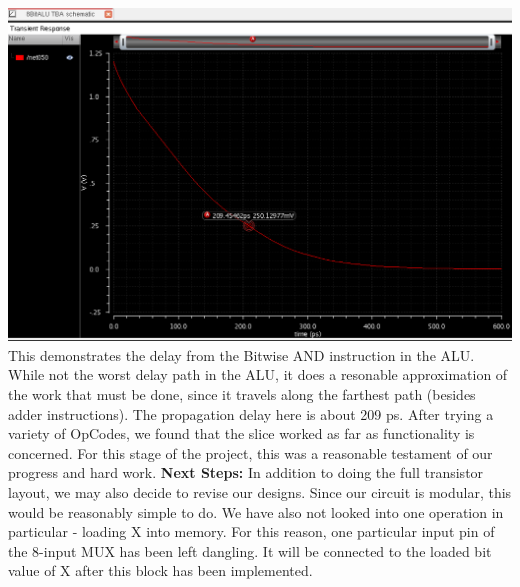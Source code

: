 \documentclass[12pt]{article}
\begin{document}
  	\includegraphics[scale=0.4]{AndDelay.png} \\
	\newline \newline
  	This demonstrates the delay from the Bitwise AND instruction in the ALU. While not the worst 
	delay path in the ALU, it does a resonable approximation of the work that must be done, since 
	it travels along the farthest path (besides adder instructions). The propagation delay
	here is about 209 ps.
	\newline \newline
	After trying a variety of OpCodes, we found that the slice worked as far as functionality 
	is concerned. For this stage of the project, this was a reasonable testament of our progress
	and hard work.
	\newline \newline
	\textbf{Next Steps:}
	\newline \newline
	In addition to doing the full transistor layout, we may also decide to revise our designs. Since
	our circuit is modular, this would be reasonably simple to do. We have also not looked into
	one operation in particular - loading X into memory. For this reason, one particular input pin 
	of the 8-input MUX has been left dangling. It will be connected to the loaded bit value of
	X after this block has been implemented. 
\end{document}
